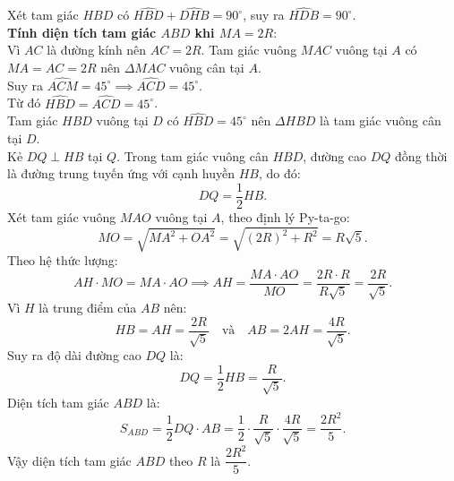 \begin{bt}
{\begin{enumerate}[a)]
		Xét tam giác $HBD$ có $\widehat{HBD} + \widehat{DHB} = 90^\circ$, suy ra $\widehat{HDB} = 90^\circ$.\\
		\textbf{Tính diện tích tam giác $ABD$ khi $MA = 2R$}:\\
		Vì $AC$ là đường kính nên $AC = 2R$. Tam giác vuông $MAC$ vuông tại $A$ có $MA = AC = 2R$ nên $\Delta MAC$ vuông cân tại $A$.\\
		Suy ra $\widehat{ACM} = 45^\circ \implies \widehat{ACD} = 45^\circ$.\\
		Từ đó $\widehat{HBD} = \widehat{ACD} = 45^\circ$.\\
		Tam giác $HBD$ vuông tại $D$ có $\widehat{HBD} = 45^\circ$ nên $\Delta HBD$ là tam giác vuông cân tại $D$.\\
		Kẻ $DQ \perp HB$ tại $Q$. Trong tam giác vuông cân $HBD$, đường cao $DQ$ đồng thời là đường trung tuyến ứng với cạnh huyền $HB$, do đó:
		$$DQ = \frac{1}{2}HB.$$
		Xét tam giác vuông $MAO$ vuông tại $A$, theo định lý Py-ta-go:
		$$MO = \sqrt{MA^2 + OA^2} = \sqrt{(2R)^2 + R^2} = R\sqrt{5}.$$
		Theo hệ thức lượng:
		$$AH \cdot MO = MA \cdot AO \implies AH = \frac{MA \cdot AO}{MO} = \frac{2R \cdot R}{R\sqrt{5}} = \frac{2R}{\sqrt{5}}.$$
		Vì $H$ là trung điểm của $AB$ nên:
		$$HB = AH = \frac{2R}{\sqrt{5}} \quad \text{và} \quad AB = 2AH = \frac{4R}{\sqrt{5}}.$$
		Suy ra độ dài đường cao $DQ$ là:
		$$DQ = \frac{1}{2}HB = \frac{R}{\sqrt{5}}.$$
		Diện tích tam giác $ABD$ là:
		$$S_{ABD} = \frac{1}{2} DQ \cdot AB = \frac{1}{2} \cdot \frac{R}{\sqrt{5}} \cdot \frac{4R}{\sqrt{5}} = \frac{2R^2}{5}.$$
		Vậy diện tích tam giác $ABD$ theo $R$ là $\dfrac{2R^2}{5}$.
	\end{enumerate}
}
\end{bt}
